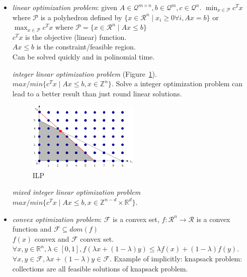 \documentclass[main]{subfiles}
\begin{document}
\begin{itemize}
\item \emph{linear optimization problem}: given $A \in \mathcal{Q}^{m \times n}, b \in
\mathcal{Q}^{m}, c \in \mathcal{Q}^{n}$. $\displaystyle \min_{x \in
\mathcal{P}} c^{T}x$ where $\mathcal{P}$ is a polyhedron defined by $\{ x \in
\mathcal{R}^{n} \mid x_{i} \geq 0 \forall i, Ax = b \}$ or $\displaystyle
\max_{x \in \mathcal{P}} c^{T}x$ where $\mathcal{P} = \{ x \in
\mathcal{R}^{n} \mid Ax \leq b \}$ \\
$c^{T}x$ is the objective (linear) function. \\
$Ax \leq b$ is the constraint/feasible region.\\
Can be solved quickly and in polinomial time.

\subitem \emph{integer linear optimization problem} (Figure~\ref{fig:ILP}).
$max/min \{ c^{T}x \mid Ax \leq b, x \in \mathbb{Z}^{n} \}$.
Solve a integer optimization problem can lead to a better result than just
round linear solutions.

\begin{figure}
  \label{fig:ILP}
  \caption{ILP}
  \centering
    \includegraphics[width=0.5\textwidth]{imgs/ILP.png}
\end{figure}

\subitem \emph{mixed integer linear optimization problem}
$max/min \{ c^{T}x \mid Ax \leq b, x \in \mathbb{Z}^{n-d} \times
\mathbb{R}^{d} \}$.

\item \emph{convex optimization problem}: $\mathcal{F}$ is a convex set, $f:
\mathcal{R}^{n} \rightarrow \mathcal{R}$ is a convex function and $\mathcal{F}
\subseteq dom(f)$\\
$f(x)$ convex and $\mathcal{F}$ convex set. $\forall x, y \in \mathbb{R}^{n},
\lambda \in [0,1], f(\lambda x + (1-\lambda)y) \leq \lambda f(x) + (1-\lambda)
f(y)$. $\forall x,y \in \mathcal{F}, \lambda x + (1-\lambda)y \in \mathcal{F}$.
\subitem Example of implicitly: knapsack problem: collections are all feasible
solutions of knapsack problem.


\end{itemize}
\end{document}
